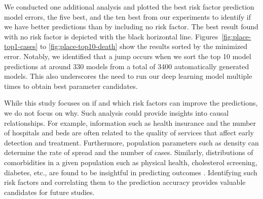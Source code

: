 \documentclass[12pt]{article}
\theoremstyle{definition}
\renewcommand{\_}{%
    \textunderscore\hspace{0pt}%
}
\begin{document}
We conducted one additional analysis and plotted the best risk factor prediction model errors, the five best, and the ten best from our experiments to identify if we have better predictions than by including no risk factor. The best result found with no risk factor is depicted with the black horizontal line. Figures~\ref{fig:place-top1-cases} to  \ref{fig:place-top10-death} show the results sorted by the minimized error. Notably, we identified that a jump occurs when we sort the top 10 model predictions at around 330 models from a total of 3400 automatically generated models. This also underscores the need to run our deep learning model multiple times to obtain best parameter candidates. 

While this study focuses on if and which risk factors can improve the predictions, we do not focus on why. Such analysis could provide insights into causal relationships. For example,  information such as health insurance and the number of hospitals and beds are often related to the quality of services that affect early detection and treatment. Furthermore, population parameters such as density can determine the rate of spread and the number of cases. Similarly, distributions of comorbidities in a given population such as physical health, cholesterol screening, diabetes, etc., are found to be insightful in predicting outcomes \cite{Maleki}. Identifying such risk factors and correlating them to the prediction accuracy provides valuable candidates for future studies.
\end{document}
